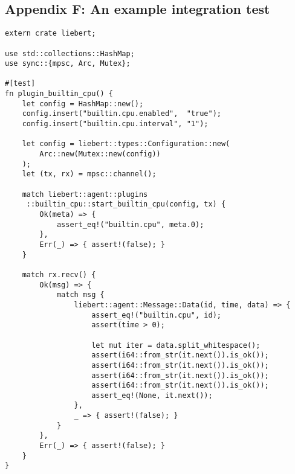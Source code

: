     \subsection{Appendix F: An example integration test}\label{apd:integration-test}
        \begin{verbatim}
extern crate liebert;

use std::collections::HashMap;
use sync::{mpsc, Arc, Mutex};

#[test]
fn plugin_builtin_cpu() {
    let config = HashMap::new();
    config.insert("builtin.cpu.enabled",  "true");
    config.insert("builtin.cpu.interval", "1");

    let config = liebert::types::Configuration::new(
        Arc::new(Mutex::new(config))
    );
    let (tx, rx) = mpsc::channel();

    match liebert::agent::plugins
     ::builtin_cpu::start_builtin_cpu(config, tx) {
        Ok(meta) => {
            assert_eq!("builtin.cpu", meta.0);
        },
        Err(_) => { assert!(false); }
    }

    match rx.recv() {
        Ok(msg) => {
            match msg {
                liebert::agent::Message::Data(id, time, data) => {
                    assert_eq!("builtin.cpu", id);
                    assert(time > 0);

                    let mut iter = data.split_whitespace();
                    assert(i64::from_str(it.next()).is_ok());
                    assert(i64::from_str(it.next()).is_ok());
                    assert(i64::from_str(it.next()).is_ok());
                    assert(i64::from_str(it.next()).is_ok());
                    assert_eq!(None, it.next());
                },
                _ => { assert!(false); }
            }
        },
        Err(_) => { assert!(false); }
    }
}
        \end{verbatim}